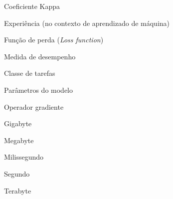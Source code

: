 \begin{simbolos}
    \item[$\kappa$] Coeficiente Kappa
    \item[$E$] Experiência (no contexto de aprendizado de máquina)
    \item[$L$] Função de perda (\textit{Loss function})
    \item[$P$] Medida de desempenho
    \item[$T$] Classe de tarefas
    \item[$\theta$] Parâmetros do modelo
    \item[$\nabla$] Operador gradiente
    \item[GB] Gigabyte
    \item[MB] Megabyte
    \item[ms] Milissegundo
    \item[s] Segundo
    \item[TB] Terabyte
\end{simbolos}

\tableofcontents*
\cleardoublepage

